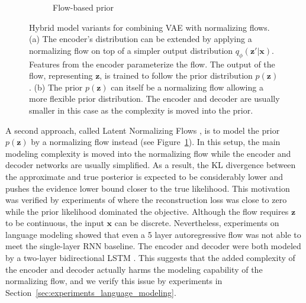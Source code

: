 \begin{figure}[t!]
\begin{subfigure}{0.39\textwidth}
        \caption{Flow-based prior}
        \label{fig:related_work_VAE_flow_hybrids_2}
    \end{subfigure}
    \caption[Hybrid model variants for combining VAEs with normalizing flows]{Hybrid model variants for combining \ac{VAE} with normalizing flows. (a) The encoder's distribution can be extended by applying a normalizing flow on top of a simpler output distribution $q_{\phi}(\bm{z}'|\bm{x})$. Features from the encoder parameterize the flow. The output of the flow, representing $\bm{z}$, is trained to follow the prior distribution $p(\bm{z})$. (b) The prior $p(\bm{z})$ can itself be a normalizing flow allowing a more flexible prior distribution. The encoder and decoder are usually smaller in this case as the complexity is moved into the prior.}
    \label{fig:related_work_VAE_flow_hybrids}
\end{figure}

A second approach, called Latent Normalizing Flows \citet{SemiDiscreteNFSequence}, is to model the prior $p(\bm{z})$ by a normalizing flow instead (see Figure~\ref{fig:related_work_VAE_flow_hybrids_2}). 
In this setup, the main modeling complexity is moved into the normalizing flow while the encoder and decoder networks are usually simplified. 
As a result, the KL divergence between the approximate and true posterior is expected to be considerably lower and pushes the evidence lower bound closer to the true likelihood. 
This motivation was verified by experiments of \citet{SemiDiscreteNFSequence} where the reconstruction loss was close to zero while the prior likelihood dominated the objective. 
Although the flow requires $\bm{z}$ to be continuous, the input $\bm{x}$ can be discrete. 
Nevertheless, experiments on language modeling showed that even a 5 layer autoregressive flow was not able to meet the single-layer RNN baseline. 
The encoder and decoder were both modeled by a two-layer bidirectional LSTM \cite{LSTM}.
This suggests that the added complexity of the encoder and decoder actually harms the modeling capability of the normalizing flow, and we verify this issue by experiments in Section~\ref{sec:experiments_language_modeling}.


